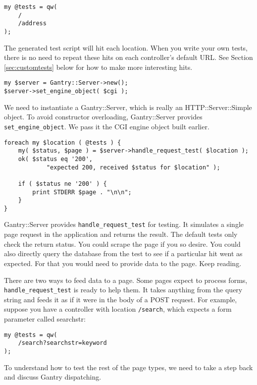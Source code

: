 \begin{verbatim}
my @tests = qw(
    /
    /address
);
\end{verbatim}

The generated test script will hit each location.  When you write your
own tests, there is no need to repeat these hits on each controller's default
URL.  See Section \ref{sec:customtests} below for how to make more
interesting hits.

\begin{verbatim}
my $server = Gantry::Server->new();
$server->set_engine_object( $cgi );
\end{verbatim}

We need to instantiate a Gantry::Server, which is really an
HTTP::Server::Simple object.  To avoid constructor overloading, Gantry::Server
provides \verb+set_engine_object+.  We pass it the CGI engine object
built earlier.

\begin{verbatim}
foreach my $location ( @tests ) {
    my( $status, $page ) = $server->handle_request_test( $location );
    ok( $status eq '200',
            "expected 200, received $status for $location" );

    if ( $status ne '200' ) {
        print STDERR $page . "\n\n";
    }
}
\end{verbatim}

Gantry::Server provides \verb+handle_request_test+ for testing.  It simulates
a single page request in the application and returns the result.  The
default tests only check the return status.  You could scrape the page
if you so desire.  You could also directly query the database from the
test to see if a particular hit went as expected.  For that you would need
to provide data to the page.  Keep reading.

There are two ways to feed data to a page.  Some pages expect to process
forms, \verb+handle_request_test+ is ready to help them.  It takes anything
from the query string and feeds it as if it were in the body of a POST
request.  For example, suppose you have a controller with location
\verb+/search+, which expects a form parameter called searchstr:

\begin{verbatim}
my @tests = qw(
    /search?searchstr=keyword
);
\end{verbatim}

To understand how to test the rest of the page types, we need to take
a step back and discuss Gantry dispatching.

